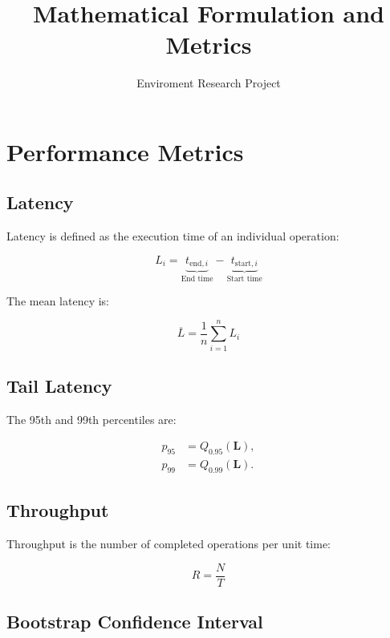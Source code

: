 \documentclass[11pt,a4paper]{article}
\title{Mathematical Formulation and Metrics}
\author{Enviroment Research Project}
\date{}
\begin{document}
\maketitle

\section{Performance Metrics}

\subsection{Latency}

Latency is defined as the execution time
of an individual operation:

\begin{equation}
L_i =
\underbrace{t_{\mathrm{end},i}}_{\text{End time}}
-
\underbrace{t_{\mathrm{start},i}}_{\text{Start time}}
\label{eq:latency}
\end{equation}

The mean latency is:

\begin{equation}
\overline{L} =
\frac{1}{n}\sum_{i=1}^{n}L_i
\label{eq:mean_latency}
\end{equation}

\subsection{Tail Latency}

The 95th and 99th percentiles are:

\begin{align}
p_{95} &= Q_{0.95}(\mathbf{L}),\\
p_{99} &= Q_{0.99}(\mathbf{L}).
\end{align}

\subsection{Throughput}

Throughput is the number of completed
operations per unit time:

\begin{equation}
R = \frac{N}{T}
\end{equation}

\subsection{Bootstrap Confidence Interval}
\end{document}

